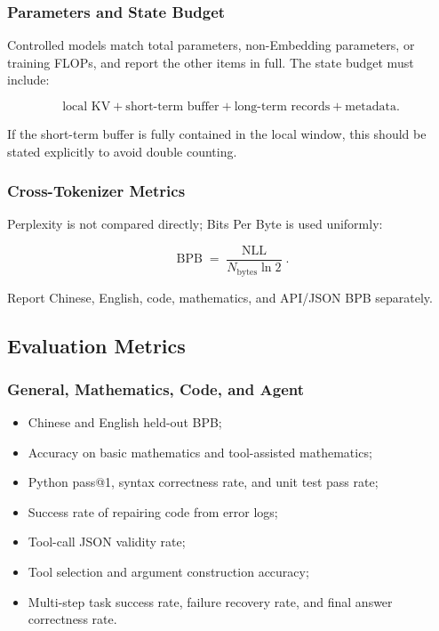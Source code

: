 \subsubsection{Parameters and State Budget}

Controlled models match total parameters, non-Embedding parameters, or training FLOPs, and report the other items in full. The state budget must include:

\[
\text{local KV}
+\text{short-term buffer}
+\text{long-term records}
+\text{metadata}.
\]

If the short-term buffer is fully contained in the local window, this should be stated explicitly to avoid double counting.

\subsubsection{Cross-Tokenizer Metrics}

Perplexity is not compared directly; Bits Per Byte is used uniformly:

\[
\operatorname{BPB} =
\frac{\operatorname{NLL}}
{N_{\mathrm{bytes}}\ln2}.
\]

Report Chinese, English, code, mathematics, and API/JSON BPB separately.

\subsection{Evaluation Metrics}

\subsubsection{General, Mathematics, Code, and Agent}

\begin{itemize}
  \item Chinese and English held-out BPB;
  \item Accuracy on basic mathematics and tool-assisted mathematics;
  \item Python pass@1, syntax correctness rate, and unit test pass rate;
  \item Success rate of repairing code from error logs;
  \item Tool-call JSON validity rate;
  \item Tool selection and argument construction accuracy;
  \item Multi-step task success rate, failure recovery rate, and final answer correctness rate.
\end{itemize}

